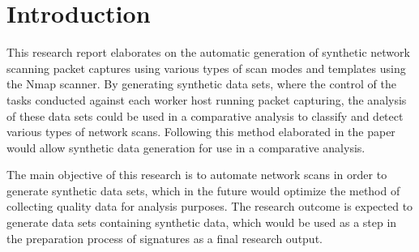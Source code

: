\chapter{Introduction}
\label{chp:Introduction}
This research report elaborates on the automatic generation of synthetic network scanning packet captures using various types of scan modes and templates using the Nmap scanner. By generating synthetic data sets, where the control of the tasks conducted against each worker host running packet capturing, the analysis of these data sets could be used in a comparative analysis to classify and detect various types of network scans. Following this method elaborated in the paper would allow synthetic data generation for use in a comparative analysis.

The main objective of this research is to automate network scans in order to generate synthetic data sets, which in the future would optimize the method of collecting quality data for analysis purposes.
The research outcome is expected to generate data sets containing synthetic data, which would be used as a step in the preparation process of signatures as a final research output.







